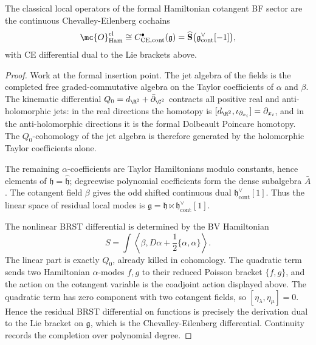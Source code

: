 \documentclass[11pt]{memoir}
\begin{document}
\begin{prop}\label{prop:grav-ops}
  The classical local operators of the formal Hamiltonian cotangent BF sector are
  the continuous Chevalley-Eilenberg cochains
  $$\mc{O}^{\mathrm{cl}}_{\mathrm{Ham}}
    \cong C^\bullet_{\mathrm{CE},\mathrm{cont}}(\mathfrak g)
    =\widehat{\mathbf{S}}\bigl(\mathfrak g^\vee_{\mathrm{cont}}[-1]\bigr),$$
  with CE differential dual to the Lie brackets above.
\end{prop}

\begin{proof}
  Work at the formal insertion point. The jet algebra of the fields is the
  completed free graded-commutative algebra on the Taylor coefficients of
  $\alpha$ and $\beta$. The kinematic differential
  $Q_0=d_{\R^2}+\bar\partial_{\C^2}$ contracts all positive real and
  anti-holomorphic jets: in the real directions the homotopy is
  $[d_{\R^2},\iota_{\partial_{x_i}}]=\partial_{x_i}$, and in the
  anti-holomorphic directions it is the formal Dolbeault Poincare homotopy.
  The $Q_0$-cohomology of the jet algebra is therefore generated by the
  holomorphic Taylor coefficients alone.

  The remaining $\alpha$-coefficients are Taylor Hamiltonians modulo constants,
  hence elements of $\mathfrak h=\widehat{\mathfrak h}$; degreewise polynomial
  coefficients form the dense subalgebra $\bar A$. The cotangent field $\beta$
  gives the odd shifted continuous dual
  $\mathfrak h^\vee_{\mathrm{cont}}[1]$. Thus the
  linear space of residual local modes is
  $\mathfrak g=\mathfrak h\ltimes\mathfrak h^\vee_{\mathrm{cont}}[1]$.

  The nonlinear BRST differential is determined by the BV Hamiltonian
  $$S=\int\left\langle\beta,D\alpha+\frac12\{\alpha,\alpha\}\right\rangle.$$
  The linear part is exactly $Q_0$, already killed in cohomology. The quadratic
  term sends two Hamiltonian $\alpha$-modes $f,g$ to their reduced Poisson
  bracket $\{f,g\}$, and the action on the cotangent variable is the coadjoint
  action displayed above. The quadratic term has zero component with two
  cotangent fields, so $[\eta_\lambda,\eta_\mu]=0$. Hence the residual BRST differential on
  functions is precisely the derivation dual to the Lie bracket on
  $\mathfrak g$, which is the Chevalley-Eilenberg differential. Continuity
  records the completion over polynomial degree.
\end{proof}
\end{document}

